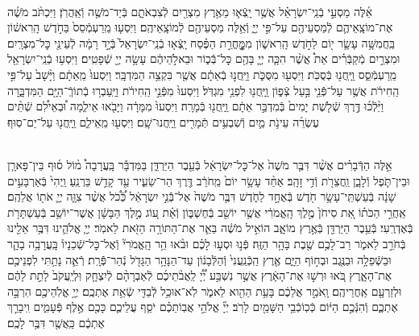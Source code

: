 \documentclass[twoside, openany, parskip=half, 11pt]{book}
\begin{document}
\begin{footnotesize}
\begin{multicols}{2}
\\
אֵ֜לֶּה מַסְעֵ֣י בְֿנֵֽי־יִשְׂרָאֵ֗ל אֲשֶׁ֥ר יָֽצְֿא֛וּ מֵאֶ֥רֶץ מִצְרַ֖יִם לְֿצִבְאֹתָ֑ם בְּֿיַד־מֹשֶׁ֖ה וְֿאַֽהֲרֹֽן׃ וַיִּכְתֹּ֨ב מֹשֶׁ֜ה אֶת־מוֹצָֽאֵיהֶ֛ם לְֿמַסְעֵיהֶ֖ם עַל־פִּ֣י יְיָ֑ וְֿאֵ֥לֶּה מַסְעֵיהֶ֖ם לְֿמוֹצָֽאֵיהֶֽם׃ וַיִּסְע֤וּ מֵֽרַעְמְֿסֵס֙ בַּחֹ֣דֶשׁ הָֽרִאשׁ֔וֹן בַּֽחֲמִשָּׁ֥ה עָשָׂ֛ר י֖וֹם לַחֹ֣דֶשׁ הָֽרִאשׁ֑וֹן מִמׇׇׇׇׇׇׇׇׇׇׇׇָּֽחֳרַ֣ת הַפֶּ֗סַח יָֽצְֿא֤וּ בְֿנֵֽי־יִשְׂרָאֵל֙ בְּֿיָ֣ד רָמָ֔ה לְֿעֵינֵ֖י כׇּל־מִצְרָֽיִם׃  וּמִצְרַ֣יִם מְֿקַבְּֿרִ֗ים אֵת֩ אֲשֶׁ֨ר הִכָּ֧ה יְיָ֛ בָּהֶ֖ם כׇּל־בְּֿֿכ֑וֹר וּבֵאלֹ֣הֵיהֶ֔ם עָשָׂ֥ה יְיָ֖ שְֿׁפָטִֽים׃ וַיִּסְע֥וּ בְֿנֵֽי־יִשְׂרָאֵ֖ל מֵֽרַעְמְֿסֵ֑ס וַֽיַּֽחֲנ֖וּ בְּֿסֻכֹּֽת׃ וַיִּסְע֖וּ מִסֻּכֹּ֑ת וַיַּֽחֲנ֣וּ בְֿאֵתָ֔ם אֲשֶׁ֖ר בִּקְצֵ֥ה הַמִּדְבָּֽר׃  וַיִּסְעוּ֙ מֵֽאֵתָ֔ם וַיָּ֨שָׁב֙ עַל־פִּ֣י הַֽחִירֹ֔ת אֲשֶׁ֥ר עַל־פְּֿֿנֵ֖י בַּ֣עַל צְֿפ֑וֹן וַֽיַּֽחֲנ֖וּ לִפְנֵ֥י מִגְדֹּֽל׃ וַיִּסְעוּ֙ מִפְּֿנֵ֣י הַֽחִירֹ֔ת וַיַּֽעַבְר֥וּ בְֿתוֹךְֿ־הַיָּ֖ם הַמִּדְבָּ֑רָה וַיֵּ֨לְֿכ֜וּ דֶּ֣רֶךְ שְֿׁלֹ֤שֶׁת יָמִים֙ בְּֿמִדְבַּ֣ר אֵתָ֔ם וַֽיַּֽחֲנ֖וּ בְּֿמָרָֽה׃ וַיִּסְעוּ֙ מִמָּרָ֔ה וַיָּבֹ֖אוּ אֵילִ֑מָה וּ֠בְאֵילִ֠ם שְֿׁתֵּ֨ים עֶשְׂרֵ֜ה עֵינֹ֥ת מַ֛יִם וְֿשִׁבְעִ֥ים תְּֿמָרִ֖ים וַֽיַּֽחֲנוּ־שָֽׁם׃ וַיִּסְע֖וּ מֵֽאֵילִ֑ם וַֽיַּֽחֲנ֖וּ עַל־יַם־סֽוּף׃

\\
אֵ֣לֶּה הַדְּֿבָרִ֗ים אֲשֶׁ֨ר דִּבֶּ֤ר מֹשֶׁה֙ אֶל־כׇּל־יִשְׂרָאֵ֔ל בְּֿעֵ֖בֶר הַיַּרְדֵּ֑ן בַּמִּדְבָּ֡ר בָּֽעֲרָבָה֩ מ֨וֹל ס֜וּף בֵּין־פָּארָ֧ן וּבֵין־תֹּ֛פֶל וְֿלָבָ֑ן וַֽחֲצֵרֹ֖ת וְֿדִ֥י זָהָֽב׃ אַחַ֨ד עָשָׂ֥ר יוֹם֙ מֵֽחֹרֵ֔ב דֶּ֖רֶךְ הַר־שֵׂעִ֑יר עַ֖ד קָדֵ֥שׁ בַּרְנֵֽעַ׃ וַֽיְהִי֙ בְּֿאַרְבָּעִ֣ים שָׁנָ֔ה בְּֿעַשְׁתֵּֽי־עָשָׂ֥ר חֹ֖דֶשׁ בְּֿאֶחָ֣ד לַחֹ֑דֶשׁ דִּבֶּ֤ר מֹשֶׁה֙ אֶל־בְּֿֿנֵ֣י יִשְׂרָאֵ֔ל כְּֿ֠כֹ֠ל אֲשֶׁ֨ר צִוָּ֧ה יְיָ֛ אֹת֖וֹ אֲלֵהֶֽם׃  אַֽחֲרֵ֣י הַכֹּת֗וֹ אֵ֚ת סִיחֹן֙ מֶ֣לֶךְ הָֽאֱמֹרִ֔י אֲשֶׁ֥ר יוֹשֵׁ֖ב בְּֿחֶשְׁבּ֑וֹן וְֿאֵ֗ת ע֚וֹג מֶ֣לֶךְ הַבָּשָׁ֔ן אֲשֶׁר־יוֹשֵׁ֥ב בְּֿעַשְׁתָּרֹ֖ת בְּֿאֶדְרֶֽעִי׃ בְּֿעֵ֥בֶר הַיַּרְדֵּ֖ן בְּֿאֶ֣רֶץ מוֹאָ֑ב הוֹאִ֣יל מֹשֶׁ֔ה בֵּאֵ֛ר אֶת־הַתּוֹרָ֥ה הַזֹּ֖את לֵאמֹֽר׃ יְיָ֧ אֱלֹהֵ֛ינוּ דִּבֶּ֥ר אֵלֵ֖ינוּ בְּֿחֹרֵ֣ב לֵאמֹ֑ר רַב־לָכֶ֥ם שֶׁ֖בֶת בָּהָ֥ר הַזֶּֽה׃ פְּֿנ֣וּ וּסְע֣וּ לָכֶ֗ם וּבֹ֨אוּ הַ֥ר הָֽאֱמֹרִי֘ וְֿאֶל־כׇּל־שְֿׁכֵנָיו֒ בָּֽעֲרָבָ֥ה בָהָ֛ר וּבַשְּֿׁפֵלָ֥ה וּבַנֶּ֖גֶב וּבְח֣וֹף הַיָּ֑ם אֶ֤רֶץ הַֽכְּֿנַֽעֲנִי֙ וְֿהַלְּֿבָנ֔וֹן עַד־הַנָּהָ֥ר הַגָּדֹ֖ל נְֿהַר־פְּֿֿרָֽת׃  רְֿאֵ֛ה נָתַ֥תִּי לִפְנֵיכֶ֖ם אֶת־הָאָ֑רֶץ בֹּ֚אוּ וּרְשׁ֣וּ אֶת־הָאָ֔רֶץ אֲשֶׁ֣ר נִשְׁבַּ֣ע יְ֠יָ֠ לַֽאֲבֹ֨תֵיכֶ֜ם לְֿאַבְרָהָ֨ם לְֿיִצְחָ֤ק וּֽלְיַֽעֲקֹב֙ לָתֵ֣ת לָהֶ֔ם וּלְזַרְעָ֖ם אַֽחֲרֵיהֶֽם׃ וָֽאֹמַ֣ר אֲלֵכֶ֔ם בָּעֵ֥ת הַהִ֖וא לֵאמֹ֑ר לֹֽא־אוּכַ֥ל לְֿבַדִּ֖י שְֿׂאֵ֥ת אֶתְכֶֽם׃ יְיָ֥ אֱלֹֽהֵיכֶ֖ם הִרְבָּ֣ה אֶתְכֶ֑ם וְֿהִנְּֿכֶ֣ם הַיּ֔וֹם כְּֿכֽוֹכְֿבֵ֥י הַשָּׁמַ֖יִם לָרֹֽב׃ יְיָ֞ אֱלֹהֵ֣י אֲבֽוֹתֵכֶ֗ם יֹסֵ֧ף עֲלֵיכֶ֛ם כָּכֶ֖ם אֶ֣לֶף פְּֿעָמִ֑ים וִֽיבָרֵ֣ךְ אֶתְכֶ֔ם כַּֽאֲשֶׁ֖ר דִּבֶּ֥ר לָכֶֽם׃


\end{multicols}
\end{footnotesize}
\end{document}

